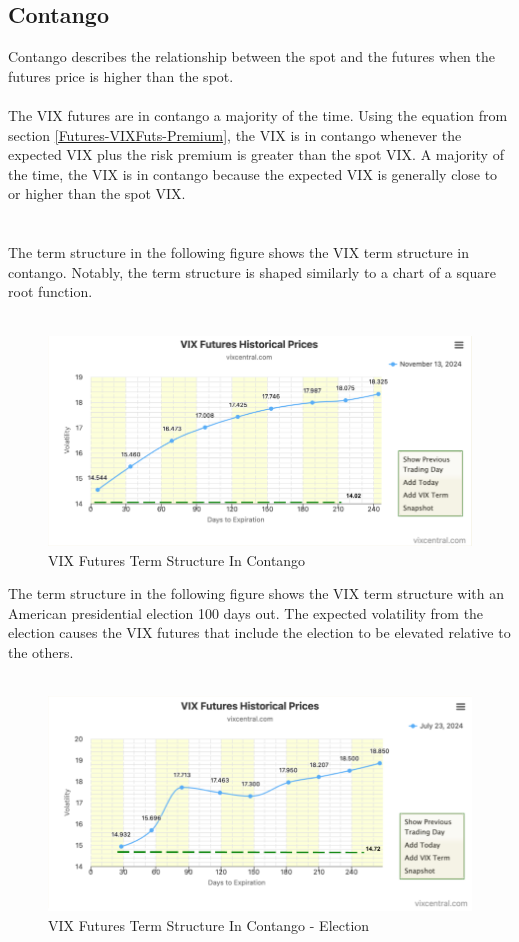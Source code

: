 \documentclass[11pt, oneside]{book}
\begin{document}
\subsection{Contango} \label{Futures-ConBackPar-Con}
Contango describes the relationship between the spot and the futures when the futures price is higher than the spot.\\
\\
The VIX futures are in contango a majority of the time. Using the equation from section \ref{Futures-VIXFuts-Premium}, the VIX is in contango whenever the expected VIX plus the risk premium is greater than the spot VIX. A majority of the time, the VIX is in contango because the expected VIX is generally close to or higher than the spot VIX.\\
\\
\\
The term structure in the following figure shows the VIX term structure in contango. Notably, the term structure is shaped similarly to a chart of a square root function.\\
\\
\begin{figure}[H]
\centering
\includegraphics[width=\textwidth]{VIXFuturesContango.png}
\caption{VIX Futures Term Structure In Contango} \label{Fig-AvgVIXDaysToExpiration}
\end{figure}
\noindent
The term structure in the following figure shows the VIX term structure with an American presidential election 100 days out. The expected volatility from the election causes the VIX futures that include the election to be elevated relative to the others.\\
\\
\begin{figure}[H]
\centering
\includegraphics[width=\textwidth]{VIXFuturesContangoElection.png}
\caption{VIX Futures Term Structure In Contango - Election} \label{Fig-VIXStructureContangoElection}
\end{figure}
\end{document}
